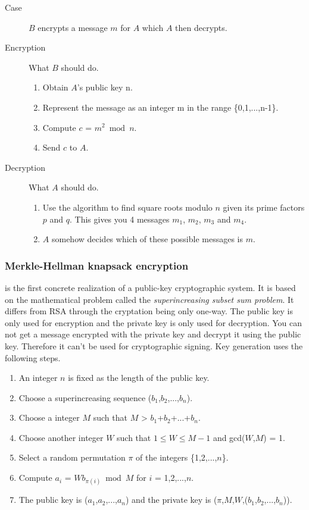 \documentclass{acm_proc_article-sp}
\begin{document}
    \begin{description}
    \item[Case] $B$ encrypts a message $m$ for $A$ which $A$ then decrypts.
    \item[Encryption] What $B$ should do.
    \begin{enumerate}
        \item Obtain $A$'s public key n.
        \item Represent the message as an integer m in the range \{0,1,...,n-1\}.
        \item Compute $c$ = $m^2 \bmod n$.
        \item Send $c$ to $A$.
    \end{enumerate}
    \item[Decryption] What $A$ should do.
    \begin{enumerate}
        \item Use the algorithm to find square roots modulo $n$ given its prime factors $p$ and $q$. This gives you 4 messages $m_1$, $m_2$, $m_3$ and $m_4$.
        \item $A$ somehow decides which of these possible messages is $m$.
    \end{enumerate}
    \end{description}
    
    \subsubsection{Merkle-Hellman knapsack encryption}
    is the first concrete realization of a public-key cryptographic system. It is based on the mathematical problem called the \textit{superincreasing subset sum problem}. It differs from RSA through the cryptation being only one-way. The public key is only used for encryption and the private key is only used for decryption. You can not get a message encrypted with the private key and decrypt it using the public key. Therefore it can't be used for cryptographic signing. Key generation uses the following steps.
    \begin{enumerate}
    \item An integer $n$ is fixed as the length of the public key.
    \item Choose a superincreasing sequence ($b_1$,$b_2$,...,$b_n$).
    \item Choose a integer $M$ such that $M$ > $b_1$+$b_2$+...+$b_n$.
    \item Choose another integer $W$ such that $1 \leq W \leq M - 1$ and gcd($W$,$M$) = 1.
    \item Select a random permutation $\pi$ of the integers \{1,2,...,$n$\}.
    \item Compute $a_i$ = $Wb_{\pi(i)} \bmod M$ for $i$ = 1,2,...,$n$.
    \item The public key is ($a_1$,$a_2$,...,$a_n$) and the private key is ($\pi$,$M$,$W$,($b_1$,$b_2$,...,$b_n$)).
    \end{enumerate}
    
\end{document}
